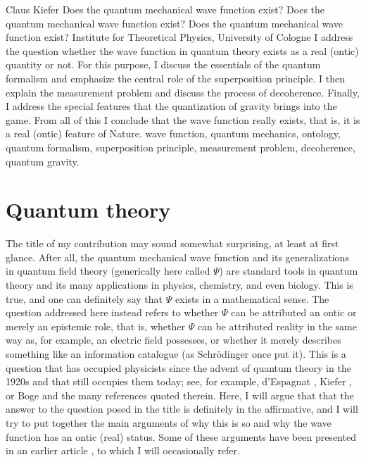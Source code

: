 \begin{artengenv}{Claus Kiefer}
	{Does the quantum mechanical wave function exist?}
	{Does the quantum mechanical wave function exist?}
	{Does the quantum mechanical wave function exist?}
	{Institute for Theoretical Physics, University of Cologne}
	{I address the question whether the wave function in quantum theory
		exists as a real (ontic) quantity or not. 
		For this purpose, I discuss the essentials of the quantum formalism and emphasize the
		central role of the superposition principle. I then explain the measurement
		problem and discuss the process of decoherence. Finally, I address the
		special features that the quantization of gravity brings into the
		game. From all of this I conclude that the wave function really
		exists, that is, it is a real (ontic) feature of Nature.}
	{wave function, quantum mechanics, ontology, quantum formalism, superposition principle, measurement problem, decoherence, quantum gravity.}







\section{Quantum theory}

\lettrine[loversize=0.13,lines=2,lraise=-0.05,nindent=0em,findent=0.2pt]%
{T}{}he title of my contribution may sound somewhat surprising, at least
at first glance. After all, the quantum mechanical wave function and
its generalizations in quantum field theory (generically here called 
$\Psi$) are standard tools in
quantum theory and its many applications in physics, chemistry, and
even biology. This is true, and one can definitely say that $\Psi$
exists in a mathematical sense. The question addressed here instead refers to
whether $\Psi$ can be attributed an ontic or merely an epistemic role,
that is, whether $\Psi$ can be attributed reality in the same way as,
for example, an electric field possesses, or whether it merely describes
something like an information catalogue (as Schr\"odinger once put
it). This is a question that has occupied physicists since the advent
of quantum theory in the 1920s and that still occupies them today;
see, for example, d'Espagnat \parencite*{despagnat_veiled_1995}, Kiefer \parencite*{kiefer_albert_2015},
or Boge \parencite*{boge_quantum_2018} and the many
references quoted therein. Here, I will argue that that the answer to
the question posed in the title is definitely in the affirmative, and I
will try to put together the main arguments of why this is so and why
the wave function has an ontic (real) status. Some of these arguments
have been presented in an earlier article \parencite{kiefer_claus_emergence_2012}, to which I
will occasionally refer.  


\end{artengenv}
